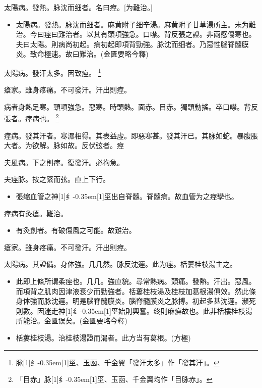 \documentclass[11pt,oneside,b5paper]{ctexbook}
\begin{document}
\begin{flushleft}
太陽病。發熱。脉沈而细者。名曰痙。[为難治。]

\begin{itemize}
\item 太陽病。發熱。脉沈而细者。麻黄附子细辛湯。麻黄附子甘草湯所主。未为難治。今曰痙曰難治者。以其有頭項強急。口噤。背反張之證。非兩感傷寒也。夫曰太陽。則病尚初起。病初起即項背勁強。脉沈而细者。乃惡性腦脊髓膜炎。致命極速。故曰難治。(金匱要略今釋)
\end{itemize}

太陽病。發汗太多。因致痙。
\footnote{脉{\hbox{\scalebox{0.68}[1]{纟}\kern-0.35em\scalebox{0.64}[1]{巠}}}、玉函、千金翼「發汗太多」作「發其汗」。}

瘡家。雖身疼痛。不可發汗。汗出則痙。

病者身熱足寒。頸項強急。惡寒。時頭熱。面赤。目赤。獨頭動搖。卒口噤。背反張者。痙病也。
\footnote{「目赤」脉{\hbox{\scalebox{0.68}[1]{纟}\kern-0.35em\scalebox{0.64}[1]{巠}}}、玉函、千金翼均作「目脉赤」。}

痙病。發其汗者。寒濕相得。其表益虛。即惡寒甚。發其汗已。其脉如蛇。暴腹脹大者。为欲解。脉如故。反伏弦者。痙

夫風病。下之則痙。復發汗。必拘急。

夫痙脉。按之緊而弦。直上下行。

\begin{itemize}
\item 張缩血管之神{\hbox{\scalebox{0.68}[1]{纟}\kern-0.35em\scalebox{0.64}[1]{巠}}}出自脊髓。脊髓病。故血管为之痙孿也。
\end{itemize}

痙病有灸瘡。難治。

\begin{itemize}
\item 有灸創者。有破傷風之可能。故難治。
\end{itemize}

瘡家。雖身疼痛。不可發汗。汗出則痙。

太陽病。其證備。身体強。几几然。脉反沈遲。此为痙。栝蔞桂枝湯主之。

\begin{itemize}
\item 此即上條所谓柔痙也。几几。強直貌。尋常熱病。頭痛。發熱。汗出。惡風。而項背之肌肉因津液衰少而勁強者。栝蔞桂枝湯及桂枝加葛根湯俱效。然此條身体強而脉沈遲。明是腦脊髓膜炎。腦脊髓膜炎之脉搏。初起多甚沈遲。瀕死則數。因迷走神{\hbox{\scalebox{0.68}[1]{纟}\kern-0.35em\scalebox{0.64}[1]{巠}}}始則興奮。终則麻痹故也。此非栝樓桂枝湯所能治。金匱误矣。(金匱要略今釋)
\item 栝蔞桂枝湯。治桂枝湯證而渴者。此方当有葛根。(方極)
\end{itemize}


\end{flushleft}
\end{document}
